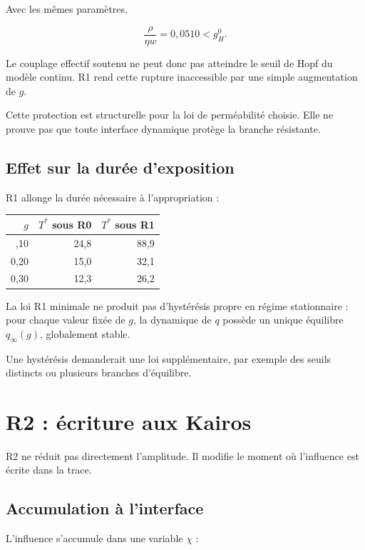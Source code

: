 Avec les mêmes paramètres,

\[
\frac{\rho}{\eta w}=0{,}0510<g_H^0.
\]

Le couplage effectif soutenu ne peut donc pas atteindre le seuil de Hopf
du modèle continu. R1 rend cette rupture inaccessible par une simple
augmentation de \(g\).

Cette protection est structurelle pour la loi de perméabilité choisie.
Elle ne prouve pas que toute interface dynamique protège la branche
résistante.

\section{Effet sur la durée d'exposition}\label{t2-effet-sur-la-duree-dexposition}

R1 allonge la durée nécessaire à l'appropriation :

\begin{longtable}[]{@{}rrr@{}}
\toprule\noalign{}
\(g\) & \(T^\ast\) sous R0 & \(T^\ast\) sous R1 \\
\midrule\noalign{}
\endhead
\bottomrule\noalign{}
\endlastfoot
0,10 & 24,8 & 88,9 \\
0,20 & 15,0 & 32,1 \\
0,30 & 12,3 & 26,2 \\
\end{longtable}

La loi R1 minimale ne produit pas d'hystérésis propre en régime stationnaire : pour chaque valeur fixée de \(g\), la dynamique de \(q\) possède un unique équilibre \(q_\infty(g)\), globalement stable.

Une hystérésis demanderait une loi supplémentaire, par exemple des seuils distincts ou plusieurs branches d'équilibre.

\chapter{R2 : écriture aux Kairos}\label{t2-r2-ecriture-aux-kairos}

R2 ne réduit pas directement l'amplitude. Il modifie le moment où
l'influence est écrite dans la trace.

\section{Accumulation à l'interface}\label{t2-accumulation-a-linterface}

L'influence s'accumule dans une variable \(\chi\) :

